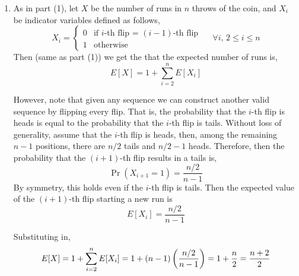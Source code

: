\documentclass[12pt]{article}
\begin{document}
\begin{solution}
\begin{enumerate}
        Then, by linearity of expectation, the expected number of runs of length exactly two is 
        \[E[X] =  \sum_{i=1}^{n} E[X_i] = \frac{n-3}{8} + \frac{1}{2} = \frac{n+1}{8}\]

        \item As in part (1), let $X$ be the number of runs in $n$ throws of the coin, and $X_i$ be indicator variables defined as follows, 
        \[ X_i = \begin{cases*}
            0 & \text{if $i$-th flip = $(i-1)$-th flip } \\ 
            1 & \text{otherwise}
        \end{cases*} \quad \forall i,\,  2 \leq i \leq n\]
        Then (same as part (1)) we get the that the expected number of runs is, 
        \[E[X] = 1 + \sum_{i=2}^{n}E[X_i]\]

        However, note that given any sequence we can construct another valid sequence by flipping every flip. That is, the probability that the $i$-th flip is heads is equal to the probability that the $i$-th flip is tails. Without loss of generality, assume that the $i$-th flip is heads, then, among the remaining $n-1$ positions, there are $n/2$ tails and $n/2 -1$ heads. Therefore, then the probability that the $(i+1)$-th flip results in a tails is, 
        \[\Pr(X_{i+1} = 1) = \frac{n/2}{n-1}\]
        By symmetry, this holds even if the $i$-th flip is tails. Then the expected value of the $(i+1)$-th flip starting a new run is 
        \[E[X_i] = \frac{n/2}{n-1}\]

        Substituting in, 
        \[E[X] = 1 + \sum_{i=2}^{n}E[X_i] = 1 + (n-1)\left(\frac{n/2}{n-1}\right) = 1 + \frac{n}{2} = \frac{n+2}{2}\]
        \end{enumerate}

\end{solution}
\end{document}
